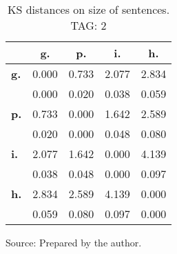 \begin{table}[h!]
\begin{center}
\caption{KS distances on size of sentences. TAG: 2}
\begin{tabular}{| l || c | c | c | c |}\hline
 & {\bf g.} & {\bf p.} & {\bf i.} & {\bf h.} \\\hline\hline
{\bf g.} & 0.000 & 0.733 & 2.077 & 2.834 \\
{\bf } & 0.000 & 0.020 & 0.038 & 0.059 \\\hline
{\bf p.} & 0.733 & 0.000 & 1.642 & 2.589 \\
{\bf } & 0.020 & 0.000 & 0.048 & 0.080 \\\hline
{\bf i.} & 2.077 & 1.642 & 0.000 & 4.139 \\
{\bf } & 0.038 & 0.048 & 0.000 & 0.097 \\\hline
{\bf h.} & 2.834 & 2.589 & 4.139 & 0.000 \\
{\bf } & 0.059 & 0.080 & 0.097 & 0.000 \\\hline
\end{tabular}
\begin{flushleft}
		Source: Prepared by the author.\
\end{flushleft}
\end{center}
\end{table}
